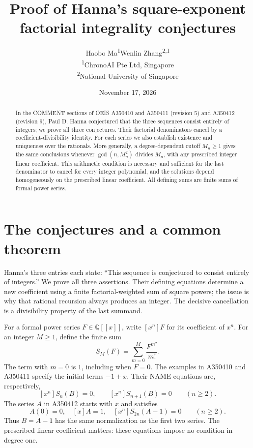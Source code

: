 \documentclass[11pt]{article}
\title{Proof of Hanna's square-exponent factorial integrality conjectures}
\author{Haobo Ma\textsuperscript{1}\qquad Wenlin Zhang\textsuperscript{2,1}\\[3pt]
  \small\textsuperscript{1}ChronoAI Pte Ltd, Singapore\\
  \small\textsuperscript{2}National University of Singapore}
\date{November 17, 2026}
\newcommand{\Q}{\mathbb{Q}}
\begin{document}
\maketitle
\begin{abstract}
In the COMMENT sections of OEIS A350410 and A350411 (revision 5) and
A350412 (revision 9), Paul D. Hanna conjectured that the three sequences
consist entirely of integers; we prove all three conjectures.
Their factorial denominators cancel by a coefficient-divisibility identity.
For each series we also establish existence and uniqueness over the rationals.
More generally, a degree-dependent cutoff $M_n\geq1$ gives the same conclusions
whenever $\gcd(n,M_n^2)$ divides $M_n$, with any prescribed integer linear
coefficient. This arithmetic condition is necessary and sufficient for
the last denominator to cancel for every integer polynomial, and the
solutions depend homogeneously on the prescribed linear coefficient.
All defining sums are finite sums of formal power series.
\end{abstract}

\section{The conjectures and a common theorem}
Hanna's three entries \cite{hanna410,hanna411,hanna412} each state:
``This sequence is conjectured to consist entirely of integers.'' We prove all three
assertions. Their defining equations determine a new coefficient using a finite
factorial-weighted sum of square powers; the issue is why that rational
recursion always produces an integer. The decisive cancellation is a
divisibility property of the last summand.

For a formal power series $F\in\Q[[x]]$, write $[x^n]F$ for its coefficient of
$x^n$. For an integer $M\geq1$, define the finite sum
\[
 S_M(F)=\sum_{m=0}^{M}\frac{F^{m^2}}{m!}.
\]
The term with $m=0$ is $1$, including when $F=0$.
The examples in A350410 and A350411 specify the initial terms $-1+x$.
Their NAME equations are, respectively,
\begin{equation}\label{eq:two}
 [x^n]S_n(B)=0,\qquad [x^n]S_{n+1}(B)=0\qquad(n\geq2).
\end{equation}
The series $A$ in A350412 starts with $x$ and satisfies
\begin{equation}\label{eq:third}
 A(0)=0,\quad [x]A=1,\quad [x^n]S_{2n}(A-1)=0\qquad(n\geq2).
\end{equation}
Thus $B=A-1$ has the same normalization as the first two series.
The prescribed linear coefficient matters: these equations impose no condition
in degree one.
\end{document}
